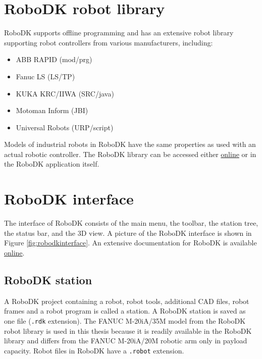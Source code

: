 \section{RoboDK robot library}

RoboDK supports offline programming and has an extensive robot library supporting robot controllers from various manufacturers, including:

\begin{itemize}
    \item ABB RAPID (mod/prg)
    \item Fanuc LS (LS/TP)
    \item KUKA KRC/IIWA (SRC/java)
    \item Motoman Inform (JBI)
    \item Universal Robots (URP/script)
\end{itemize}
Models of industrial robots in RoboDK have the same properties as used with an actual robotic controller. The RoboDK library can be accessed either \href{https://robodk.com/library}{online}  or in the RoboDK application itself. 



\section{RoboDK interface}

The interface of RoboDK consists of the main menu, the toolbar, the station tree, the status bar, and the 3D view. A picture of the RoboDK interface is shown in Figure \ref{fig:robodkinterface}. An extensive documentation for RoboDK is available \href{https://robodk.com/doc/en/Basic-Guide.html#Start}{online}.

\subsection{RoboDK station}

A RoboDK project containing a robot, robot tools, additional CAD files, robot frames and a robot program is called a station. A RoboDK station is saved as one file (\texttt{.rdk} extension).  The FANUC M-20iA/35M model from the RoboDK robot library is used in this thesis because it is readily available in the RoboDK library and differs from the FANUC M-20iA/20M robotic arm only in payload capacity. Robot files in RoboDK have a \texttt{.robot} extension.

